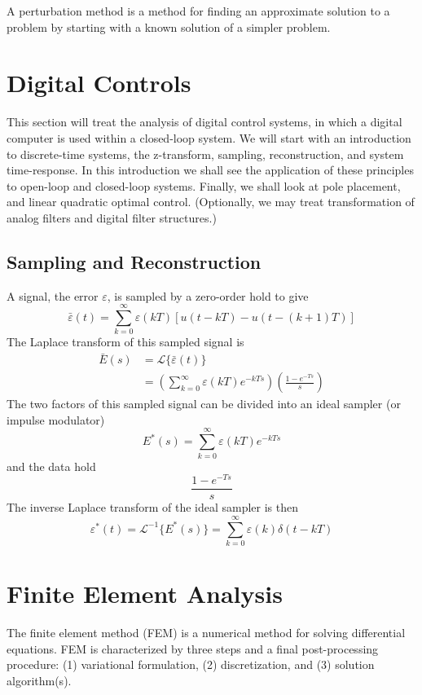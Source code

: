 \documentclass[11pt]{report}
\begin{document}
A perturbation method is a method for finding an approximate solution to a problem by starting with a known solution of a simpler problem.

\chapter{Digital Controls}

This section will treat the analysis of digital control systems, in which a digital computer is used within a closed-loop system. We will start with an introduction to discrete-time systems, the z-transform, sampling, reconstruction, and system time-response. In this introduction we shall see the application of these principles to open-loop and closed-loop systems. Finally, we shall look at pole placement, and linear quadratic optimal control. (Optionally, we may treat transformation of analog filters and digital filter structures.)

\section{Sampling and Reconstruction}

A signal, the error $\varepsilon$, is sampled by a zero-order hold to give
\begin{equation}
	\bar{\varepsilon}(t)=\sum_{k=0}^\infty{\varepsilon(kT)[u(t-kT)-u(t-(k+1)T)]}
\end{equation}
The Laplace transform of this sampled signal is
\begin{align}
	\bar{E}(s)&=\mathcal{L}\{\bar{\varepsilon}(t)\}\\
	&=\left(\sum_{k=0}^\infty{\varepsilon(kT)e^{-kTs}}\right)\left(\frac{1-e^{-Ts}}{s}\right)
\end{align}
The two factors of this sampled signal can be divided into an ideal sampler (or impulse modulator)
\begin{equation}
	E^\ast(s)=\sum_{k=0}^\infty{\varepsilon(kT)e^{-kTs}}
\end{equation}
and the data hold
\begin{equation}
	\frac{1-e^{-Ts}}{s}
\end{equation}
The inverse Laplace transform of the ideal sampler is then
\begin{equation}
	\varepsilon^\ast(t)=\mathcal{L}^{-1}\{E^\ast(s)\}=\sum_{k=0}^\infty{\varepsilon(k)\delta(t-kT)}
\end{equation}

\chapter{Finite Element Analysis}

The finite element method (FEM) is a numerical method for solving differential equations. FEM is characterized by three steps and a final post-processing procedure: (1) variational formulation, (2) discretization, and (3) solution algorithm(s).
\end{document}
